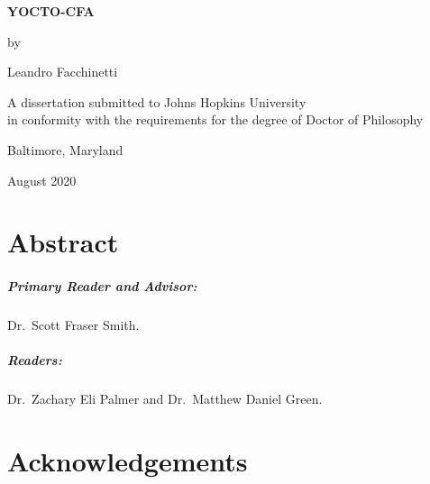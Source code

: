\documentclass[12pt, oneside]{book}
\begin{document}
\frontmatter

\begin{center}
\begin{singlespace}
\vspace*{0.5in}

\textbf{\uppercase{Yocto-CFA}}

\vspace*{1in}

by

Leandro Facchinetti

\vspace*{1.5in}

A dissertation submitted to Johns Hopkins University\\in conformity with the requirements for the degree of Doctor of Philosophy

\vspace*{0.5in}

Baltimore, Maryland

August 2020
\end{singlespace}
\end{center}

\thispagestyle{empty}
\clearpage

\chapter{Abstract}


\paragraph{Primary Reader and Advisor:}

Dr.~Scott Fraser Smith.

\paragraph{Readers:}

Dr.~Zachary Eli Palmer and Dr.~Matthew Daniel Green.

\chapter{Acknowledgements}


\tableofcontents
\listoftables
\listoffigures

\mainmatter

\end{document}
